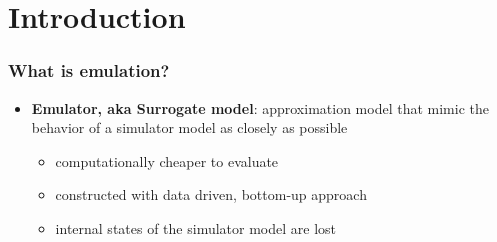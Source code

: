 \documentclass[xcolor=dvipsnames, USenglish]{beamer}  %
\begin{document}
\section{Introduction}

  \begin{frame}
    \frametitle{What is emulation?}
    \begin{itemize}
      \item \textbf{Emulator, aka Surrogate model}: approximation model that mimic
      the behavior of a simulator model as closely as possible
      \begin{itemize}
        \item computationally cheaper to evaluate
        \item constructed with data driven, bottom-up approach
        \item internal states of the simulator model are lost
      \end{itemize}
    \end{itemize}


\end{frame}
\end{document}
